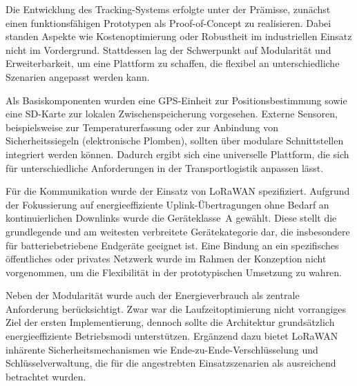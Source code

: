Die Entwicklung des Tracking-Systems erfolgte unter der Prämisse, zunächst einen funktionsfähigen Prototypen als Proof-of-Concept zu realisieren. Dabei standen Aspekte wie Kostenoptimierung oder Robustheit im industriellen Einsatz nicht im Vordergrund. Stattdessen lag der Schwerpunkt auf Modularität und Erweiterbarkeit, um eine Plattform zu schaffen, die flexibel an unterschiedliche Szenarien angepasst werden kann. 

Als Basiskomponenten wurden eine GPS-Einheit zur Positionsbestimmung sowie eine SD-Karte zur lokalen Zwischenspeicherung vorgesehen. Externe Sensoren, beispielsweise zur Temperaturerfassung oder zur Anbindung von Sicherheitssiegeln (elektronische Plomben), sollten über modulare Schnittstellen integriert werden können. Dadurch ergibt sich eine universelle Plattform, die sich für unterschiedliche Anforderungen in der Transportlogistik anpassen lässt. 

Für die Kommunikation wurde der Einsatz von LoRaWAN spezifiziert. Aufgrund der Fokussierung auf energieeffiziente Uplink-Übertragungen ohne Bedarf an kontinuierlichen Downlinks wurde die Geräteklasse~A gewählt. Diese stellt die grundlegende und am weitesten verbreitete Gerätekategorie dar, die insbesondere für batteriebetriebene Endgeräte geeignet ist. Eine Bindung an ein spezifisches öffentliches oder privates Netzwerk wurde im Rahmen der Konzeption nicht vorgenommen, um die Flexibilität in der prototypischen Umsetzung zu wahren. 

Neben der Modularität wurde auch der Energieverbrauch als zentrale Anforderung berücksichtigt. Zwar war die Laufzeitoptimierung nicht vorrangiges Ziel der ersten Implementierung, dennoch sollte die Architektur grundsätzlich energieeffiziente Betriebsmodi unterstützen. Ergänzend dazu bietet LoRaWAN inhärente Sicherheitsmechanismen wie Ende-zu-Ende-Verschlüsselung und Schlüsselverwaltung, die für die angestrebten Einsatzszenarien als ausreichend betrachtet wurden. 
